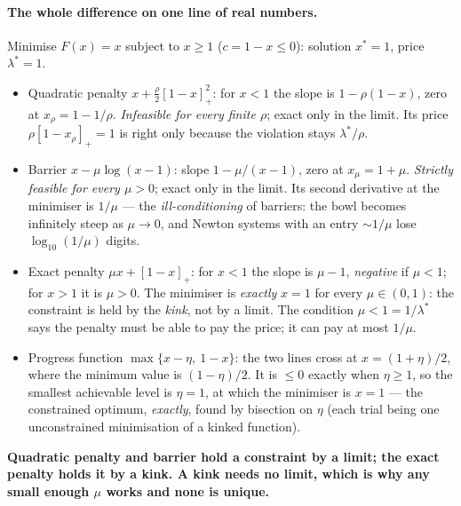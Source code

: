 \documentclass[11pt,a4paper]{article}
\newcommand{\revc}[1]{#1}
\begin{document}
\paragraph{The whole difference on one line of real numbers.}  Minimise $F(x)=x$ subject
to $x\ge1$ ($c=1-x\le0$): solution $x^\ast=1$, price $\lambda^\ast=1$.
\begin{itemize}[leftmargin=1.5em,itemsep=1pt]
\item Quadratic penalty $x+\tfrac\rho2[1-x]_+^2$: for $x<1$ the slope is $1-\rho(1-x)$,
zero at $x_\rho=1-1/\rho$.  \emph{Infeasible for every finite $\rho$}; exact only in the
limit.  Its price $\rho[1-x_\rho]_+=1$ is right only because the violation stays
$\lambda^\ast/\rho$.
\item Barrier $x-\mu\log(x-1)$: slope $1-\mu/(x-1)$, zero at $x_\mu=1+\mu$.
\emph{Strictly feasible for every $\mu>0$}; exact only in the limit.  Its second
derivative at the minimiser is $1/\mu$ --- the \emph{ill-conditioning} of barriers: the
bowl becomes infinitely steep as $\mu\to0$, and Newton systems with an entry $\sim1/\mu$
lose $\log_{10}(1/\mu)$ digits.
\item Exact penalty $\mu x+[1-x]_+$: for $x<1$ the slope is $\mu-1$, \emph{negative} if
$\mu<1$; for $x>1$ it is $\mu>0$.  The minimiser is \emph{exactly} $x=1$ for every
$\mu\in(0,1)$: the constraint is held by the \emph{kink}, not by a limit.  The condition
$\mu<1=1/\lambda^\ast$ says the penalty must be able to pay the price; it can pay at most
$1/\mu$.
\item \revc{Progress function $\max\{x-\eta,\ 1-x\}$: the two lines cross at
$x=(1+\eta)/2$, where the minimum value is $(1-\eta)/2$.  It is $\le0$ exactly when
$\eta\ge1$, so the smallest achievable level is $\eta=1$, at which the minimiser is
$x=1$ --- the constrained optimum, \emph{exactly}, found by bisection on $\eta$ (each
trial being one unconstrained minimisation of a kinked function).}
\end{itemize}
\textbf{Quadratic penalty and barrier hold a constraint by a limit; the exact penalty
holds it by a kink.  A kink needs no limit, which is why any small enough $\mu$ works and
none is unique.}
\end{document}
